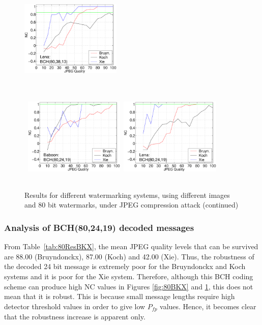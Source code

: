\documentclass[12pt]{report}
\begin{document}
\begin{figure}[p]
{{        \includegraphics[height=4.6cm,width=4.8cm]{BKX_EPS_formattedBetter/Lena80_38_13.eps} \\
}} 
\centerline{ \hbox{
        \includegraphics[height=4.6cm,width=4.8cm]{BKX_EPS_formattedBetter/Baboon80_24_19.eps}
        \includegraphics[height=4.6cm,width=4.8cm]{BKX_EPS_formattedBetter/Lena80_24_19.eps} \\
}} 
        \caption{Results for different watermarking systems, using different images and 80 bit watermarks, 
	under JPEG compression attack (continued)}
        \label{fig:80extraBKX}
\setlength{\abovecaptionskip}{0cm}
\end{figure}


\subsubsection{Analysis of BCH(80,24,19) decoded messages}
From Table~\ref{tab:80ResBKX}, the mean JPEG quality levels that can be survived 
are 88.00 (Bruyndonckx),
87.00 (Koch) and 42.00 (Xie). 
Thus, the robustness of the decoded 24 bit message is extremely poor for the Bruyndonckx and Koch 
systems and it is poor for the Xie system. Therefore, although this BCH coding scheme can produce high NC values in Figures
\ref{fig:80BKX} and \ref{fig:80extraBKX},
this does not mean that it is robust. This is because
small message lengths require high detector threshold values in order to give low $P_{fp}$ values. Hence, it becomes clear that the robustness
increase is apparent only.
\end{document}
